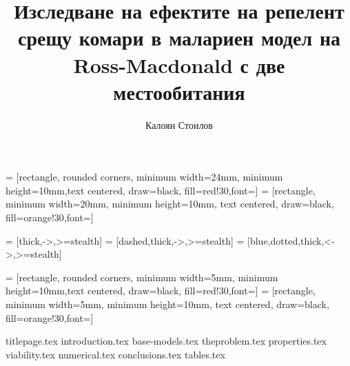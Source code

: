 \documentclass[bulgarian, 12pt]{article}
\title{Изследване на ефектите на репелент срещу комари в малариен модел на Ross-Macdonald с две местообитания}
\author{Калоян Стоилов}
\theoremstyle{definition}
\begin{document}

\usetikzlibrary{shapes,fit}
\tikzset{>=latex}
\usetikzlibrary{shapes.geometric, arrows.meta}

 = [rectangle, rounded corners, minimum width=24mm, minimum height=10mm,text centered, draw=black, fill=red!30,font=\small ]
 = [rectangle, minimum width=20mm, minimum height=10mm, text centered, draw=black, fill=orange!30,font=\small ]

 = [thick,->,>=stealth]
 = [dashed,thick,->,>=stealth]
 = [blue,dotted,thick,<->,>=stealth]

 = [rectangle, rounded corners, minimum width=5mm, minimum height=10mm,text centered, draw=black, fill=red!30,font=\small ]
 = [rectangle, minimum width=5mm, minimum height=10mm, text centered, draw=black, fill=orange!30,font=\small ]

{titlepage.tex}
\tableofcontents
\thispagestyle{empty}
\newpage
\setcounter{page}{1}
{introduction.tex}
{base-models.tex}
{theproblem.tex}
{properties.tex}
{viability.tex}
{numerical.tex}
{conclusions.tex}
{tables.tex}
\pagebreak
\printbibliography[heading=bibintoc]
% 
% 
\end{document}
